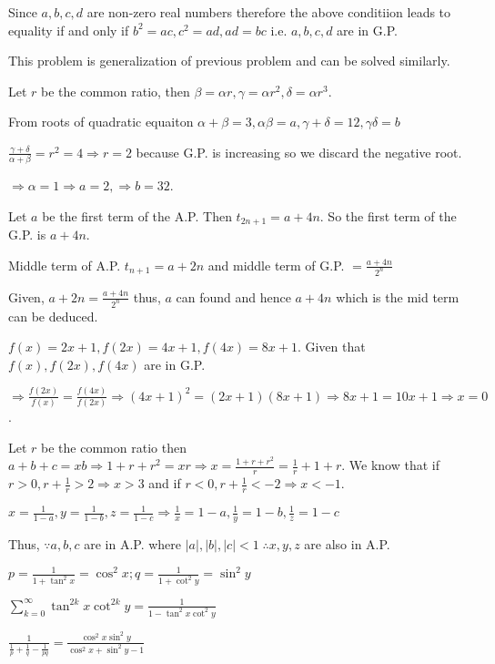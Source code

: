   Since $a, b, c, d$ are non-zero real numbers therefore the above conditiion leads to equality if and only
  if $b^2 = ac, c^2 = ad, ad = bc$ i.e. $a, b, c, d$ are in G.P.
\item This problem is generalization of previous problem and can be solved similarly.
\item Let $r$ be the common ratio, then $\beta = \alpha r, \gamma = \alpha r^2, \delta = \alpha r^3$.

  From roots of quadratic equaiton $\alpha + \beta = 3, \alpha\beta = a, \gamma + \delta = 12, \gamma\delta
  = b$

  $\frac{\gamma + \delta}{\alpha + \beta} = r^2 = 4 \Rightarrow r = 2$ because G.P. is increasing so we
  discard the negative root.

  $\Rightarrow \alpha = 1 \Rightarrow a = 2, \Rightarrow b = 32$.
\item Let $a$ be the first term of the A.P. Then $t_{2n + 1} = a + 4n$. So the first term of the G.P. is $a
  + 4n$.

  Middle term of A.P. $t_{n + 1} = a + 2n$ and middle term of G.P. $= \frac{a + 4n}{2^n}$

  Given, $a + 2n = \frac{a + 4n}{2^n}$ thus, $a$ can found and hence $a + 4n$ which is the mid term can be
  deduced.
\item $f(x) = 2x + 1, f(2x) = 4x + 1, f(4x) = 8x + 1$. Given that $f(x), f(2x), f(4x)$ are in G.P.

  $\Rightarrow \frac{f(2x)}{f(x)} = \frac{f(4x)}{f(2x)} \Rightarrow (4x + 1)^2 = (2x + 1)(8x + 1)
  \Rightarrow 8x + 1 = 10x + 1 \Rightarrow x = 0$.
\item Let $r$ be the common ratio then $a + b + c = xb \Rightarrow 1 + r + r^2 = xr \Rightarrow x = \frac{1
  + r + r^2}{r} = \frac{1}{r} + 1 + r$. We know that if $r > 0, r + \frac{1}{r} > 2 \Rightarrow x > 3$ and
  if $r < 0, r + \frac{1}{r} < -2 \Rightarrow x < -1$.
\item $x = \frac{1}{1 - a}, y = \frac{1}{1 - b}, z = \frac{1}{1 - c} \Rightarrow \frac{1}{x} = 1 - a,
  \frac{1}{y} = 1 - b, \frac{1}{z} = 1 - c$

  Thus, $\because a, b, c$ are in A.P. where $|a|, |b|, |c| < 1\;\therefore x, y, z$ are also in A.P.
\item $p = \frac{1}{1 + \tan^2x} = \cos^2x; q = \frac{1}{1 + \cot^2y} = \sin^2y$

  $\displaystyle\sum_{k = 0}^{\infty}\tan^{2k}x\cot^{2k}y = \frac{1}{1 - \tan^2x\cot^2y}$

  $\frac{1}{\frac{1}{p} + \frac{1}{q} - \frac{1}{pq}} = \frac{\cos^2x\sin^2y}{\cos^2x + \sin^2y - 1}$

